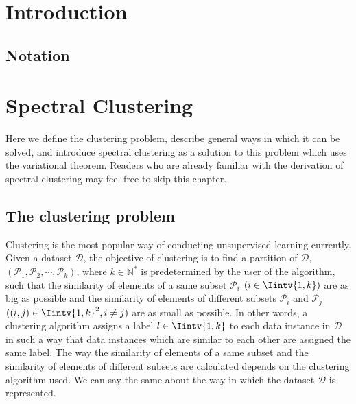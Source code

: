 \tableofcontents
\listoffigures

\pagebreak \setcounter{page}{1}


\chapter{Introduction}


\section{Notation}

\chapter{Spectral Clustering}
Here we define the clustering problem, describe general ways in which it can be solved, and introduce
spectral clustering as a solution to this problem which uses the variational theorem.
Readers who are already familiar with the derivation of spectral clustering may feel free to skip this chapter. 

\section{The clustering problem}

Clustering is the most popular way of conducting unsupervised learning currently. 
Given a dataset $\mathcal D$, the objective of clustering is to find a partition of $\mathcal D$, $(\mathcal P_1, \mathcal P_2, \cdots, \mathcal P_k)$, where $k \in \mathbb N^*$ is predetermined by the user of the algorithm, such that the similarity of elements of a same subset $\mathcal P_i$  $(i \in \Iintv{1,k})$ are as big as possible and the similarity of elements of different subsets $\mathcal P_i$ and $\mathcal P_j$ $((i,j) \in \Iintv{1,k}^2, i \ne j)$ are as small as possible. 
In other words, a clustering algorithm assigns a label $l \in \Iintv{1,k}$ to each data instance in $\mathcal D$ in such a way that data instances which are similar to each other are assigned the same label.
The way the similarity of elements of a same subset and the similarity of elements of different subsets are calculated depends on the clustering algorithm used. 
We can say the same about the way in which the dataset $\mathcal D$ is represented.

